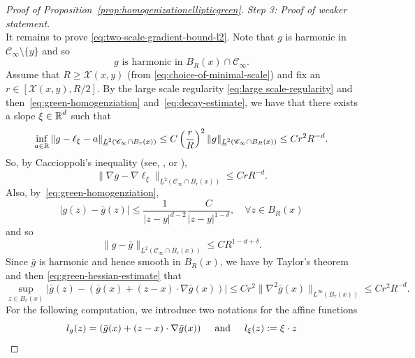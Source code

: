 \documentclass[12pt]{amsart}
\numberwithin{equation}{section}
\begin{document}
\begin{proof}[Proof of Proposition~\ref{prop:homogenizationellipticgreen}]
		\medskip 
		{\it Step 3: Proof of weaker statement.} \\
		It remains to prove \eqref{eq:two-scale-gradient-bound-l2}.  Note that $g$ is harmonic in $\mathscr{C}_{\infty} \setminus \{y\}$
		and so
		\[
		\mbox{$g$ is harmonic in $B_R(x) \cap \mathscr{C}_{\infty}$}.
		\]
		Assume that $R \geq \mathcal{X}(x,y)$ (from \eqref{eq:choice-of-minimal-scale}) and fix an $r \in [\mathcal{X}(x,y), R/2]$. By the large scale regularity \eqref{eq:large scale-regularity} and then~\eqref{eq:green-homogenziation} and~\eqref{eq:decay-estimate}, we have that there exists a slope $\xi \in \operatorname{\mathbb{R}}^d$ such that
		\begin{equation} \label{eq:green-large scale-regularity}
			\inf_{a \in \operatorname{\mathbb{R}}} \| g - \ell_\xi - a \|_{\underline{L}^2(\mathscr{C}_{\infty} \cap B_r(x))} \leq C \left( \frac{r}{R} \right)^{2} \| g\|_{\underline{L}^2(\mathscr{C}_{\infty} \cap B_R(x))}
			\leq C r^2 R^{-d}.
		\end{equation}
		So, by Caccioppoli's inequality (see, \eg, \cite[Lemma 3.5]{armstrong-dario-2018} or \cite{delmotte-elliptic-estimates}), 
		\begin{equation} \label{eq:cacciopoli-apply}
			\| \nabla g - \nabla \ell_\xi  \|_{\underline{L}^2(\mathscr{C}_{\infty} \cap  B_r(x))} \leq C r R^{-d}.
		\end{equation}
		Also, by~\eqref{eq:green-homogenziation},
		\[
		|g(z) - \bar{g}(z)|  \leq \frac{1}{|z-y|^{d-2}} \frac{C}{|z-y|^{1-\delta}}, \quad \forall z \in B_R(x)
		\]
		and so 
		\begin{equation} \label{eq:homogenization-green-close}
			\| g - \bar{g} \|_{\underline{L}^2(\mathscr{C}_{\infty} \cap B_r(x))} \leq C R^{1 - d + \delta}.
		\end{equation}
		Since $\bar{g}$ is harmonic and hence smooth in $B_R(x)$, we have by Taylor's theorem and then \eqref{eq:green-hessian-estimate} that
		\begin{equation} \label{eq:green-taylor-expansion}
			\sup_{z \in B_r(x)}  
			| \bar{g}(z) - ( \bar{g}(x) + (z-x) \cdot \nabla \bar{g}(x)) |
			\leq C r^2 \| \nabla^2 \bar{g}(x) \|_{L^{\infty}(B_r(x))}
			\leq C r^2 R^{-d}.
		\end{equation}
		For the following computation, we introduce two notations for the affine functions 
		\[
		l_g(z) =  ( \bar{g}(x) + (z-x) \cdot \nabla \bar{g}(x)) \hspace{5mm}\mbox{and} \hspace{5mm} l_\xi(z) := \xi \cdot z
		\]

\end{proof}
\end{document}
